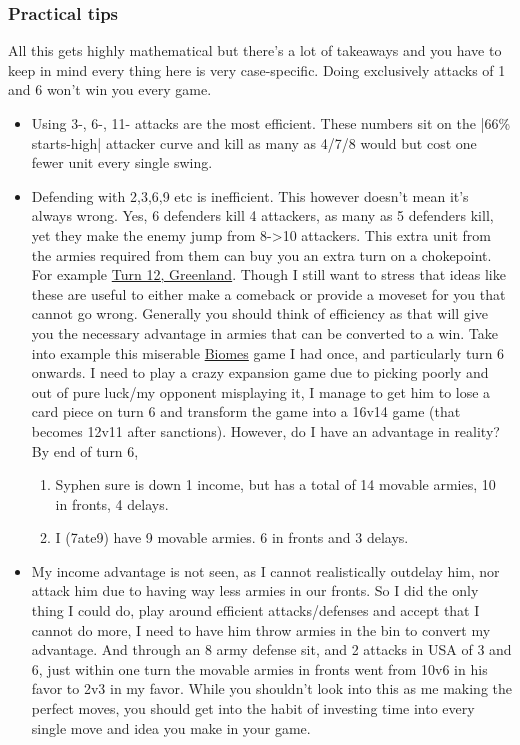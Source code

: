 \subsubsection{Practical tips}

All this gets highly mathematical but there's a lot of takeaways and you have to keep in mind every thing here is very case-specific. Doing exclusively attacks of 1 and 6 won't win you every game.
\begin{itemize}
    \item Using 3-, 6-, 11- attacks are the most efficient. These numbers sit on the |66\% starts-high| attacker curve and kill as many as 4/7/8 would but cost one fewer unit every single swing. 
    \item Defending with 2,3,6,9 etc is inefficient. This however doesn't mean it's always wrong. Yes, 6 defenders kill 4 attackers, as many as 5 defenders kill, yet they make the enemy jump from 8->10 attackers. This extra unit from the armies required from them can buy you an extra turn on a chokepoint. For example \href{https://www.warzone.com/MultiPlayer?GameID=39915640}{Turn 12, Greenland}. Though I still want to stress that ideas like these are useful to either make a comeback or provide a moveset for you that cannot go wrong. Generally you should think of efficiency as that will give you the necessary advantage in armies that can be converted to a win. Take into example this miserable \href{https://www.warzone.com/MultiPlayer?GameID=41012101}{Biomes} game I had once, and particularly turn 6 onwards. I need to play a crazy expansion game due to picking poorly and out of pure luck/my opponent misplaying it, I manage to get him to lose a card piece on turn 6 and transform the game into a 16v14 game (that becomes 12v11 after sanctions). However, do I have an advantage in reality? By end of turn 6, 
    \begin{enumerate}
        \item Syphen sure is down 1 income, but has a total of 14 movable armies, 10 in fronts, 4 delays.
        \item I (7ate9) have 9 movable armies. 6 in fronts and 3 delays.
    \end{enumerate}
    \item My income advantage is not seen, as I cannot realistically outdelay him, nor attack him due to having way less armies in our fronts. So I did the only thing I could do, play around efficient attacks/defenses and accept that I cannot do more, I need to have him throw armies in the bin to convert my advantage. And through an 8 army defense sit, and 2 attacks in USA of 3 and 6, just within one turn the movable armies in fronts went from 10v6 in his favor to 2v3 in my favor. While you shouldn't look into this as me making the perfect moves, you should get into the habit of investing time into every single move and idea you make in your game.
\end{itemize}


